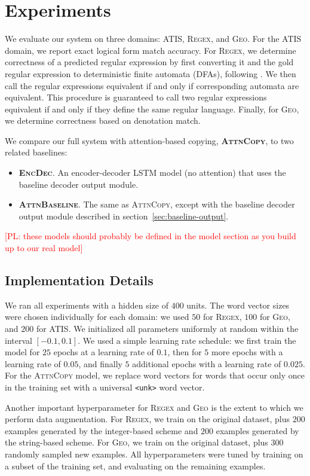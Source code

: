 \documentclass[11pt,letterpaper]{article}
\newcommand{\encdec}{\textsc{EncDec}\xspace}
\newcommand{\attn}{\textsc{AttnBaseline}\xspace}
\newcommand{\attncopy}{\textsc{AttnCopy}\xspace}
\newcommand{\atis}{\textsc{ATIS}\xspace}
\newcommand{\regex}{\textsc{Regex}\xspace}
\newcommand{\geo}{\textsc{Geo}\xspace}
\newcommand\pl[1]{\textcolor{red}{[PL: #1]}}
\begin{document}
\section{Experiments}
We evaluate our system on three domains: \atis, \regex, and \geo.
For the \atis domain, we report exact logical form match accuracy.
For \regex, we determine correctness of a predicted regular expression
by first converting it and the gold regular expression to
deterministic finite automata (DFAs), following .
We then call the regular expressions
equivalent if and only if corresponding automata are equivalent.
This procedure is guaranteed to call two regular expressions equivalent
if and only if they define the same regular language.
Finally, for \geo, we determine correctness based on denotation match.

We compare our full system with attention-based copying, \textbf{\attncopy}, 
to two related baselines:
\begin{itemize}
  \item \textbf{\encdec}.  An encoder-decoder LSTM model (no attention)
    that uses the baseline decoder output module.
  \item \textbf{\attn}.  The same as \attncopy, except with the baseline decoder
    output module described in section~\ref{sec:baseline-output}.
\end{itemize}
\pl{these models should probably be defined in the model section as you build up to our
real model}

\subsection{Implementation Details}
We ran all experiments with a hidden size of $400$ units.
The word vector sizes were chosen individually for each domain:
we used $50$ for \regex, $100$ for \geo, and $200$ for \atis.
We initialized all parameters uniformly at random 
within the interval $[-0.1, 0.1]$.
We used a simple learning rate schedule:
we first train the model for $25$ epochs at a learning rate of $0.1$,
then for $5$ more epochs with a learning rate of $0.05$,
and finally $5$ additional epochs with a learning rate of $0.025$.
For the \attncopy model, we replace word vectors for words
that occur only once in the training set 
with a universal \texttt{<unk>} word vector.

Another important hyperparameter for \regex and \geo is the
extent to which we perform data augmentation.
For \regex, we train on the original dataset,
plus $200$ examples generated by the integer-based scheme
and $200$ examples generated by the string-based scheme.
For \geo, we train on the original dataset,
plus $300$ randomly sampled new examples.
All hyperparameters were tuned by training on a subset of the
training set, and evaluating on the remaining examples.
\end{document}
